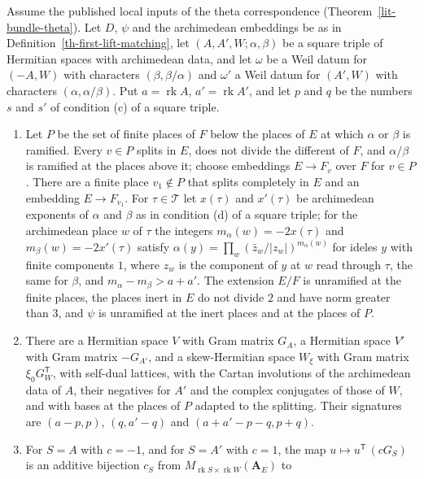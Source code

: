 \begin{lemma}\label{th-darboux-reading}
Assume the published local inputs of the theta correspondence
(Theorem~\ref{lit-bundle-theta}). Let $D$, $\psi$ and the archimedean
embeddings be as in Definition~\ref{th-first-lift-matching}, let
$(A,A',W;\alpha,\beta)$ be a square triple of Hermitian spaces with
archimedean data, and let $\omega$ be a Weil datum for $(-A,W)$ with
characters $(\beta,\beta/\alpha)$ and $\omega'$ a Weil datum for $(A',W)$ with
characters $(\alpha,\alpha/\beta)$. Put $a=\operatorname{rk}A$,
$a'=\operatorname{rk}A'$, and let $p$ and $q$ be the numbers $s$ and $s'$ of
condition (c) of a square triple.
\begin{enumerate}
\item Let $P$ be the set of finite places of $F$ below the places of $E$ at
  which $\alpha$ or $\beta$ is ramified. Every $v\in P$ splits in $E$, does
  not divide the different of $F$, and $\alpha/\beta$ is ramified at the
  places above it; choose embeddings $E\to F_v$ over $F$ for $v\in P$. There
  are a finite place $v_1\notin P$ that splits completely in $E$ and an
  embedding $E\to F_{v_1}$. For $\tau\in\mathcal T$ let $x(\tau)$ and
  $x'(\tau)$ be archimedean exponents of $\alpha$ and $\beta$ as in condition
  (d) of a square triple; for the archimedean place $w$ of $\tau$ the integers
  $m_\alpha(w)=-2x(\tau)$ and $m_\beta(w)=-2x'(\tau)$ satisfy
  $\alpha(y)=\prod_w(\bar z_w/|z_w|)^{m_\alpha(w)}$ for ideles $y$ with
  finite components $1$, where $z_w$ is the component of $y$ at $w$ read
  through $\tau$, the same for $\beta$, and $m_\alpha-m_\beta>a+a'$. The
  extension $E/F$ is unramified at the finite places, the places inert in $E$
  do not divide $2$ and have norm greater than $3$, and $\psi$ is unramified
  at the inert places and at the places of $P$.
\item There are a Hermitian space $V$ with Gram matrix $G_A$, a Hermitian
  space $V'$ with Gram matrix $-G_{A'}$, and a skew-Hermitian space $W_\xi$ with
  Gram matrix $\xi_0G_W^{\mathsf T}$, with self-dual lattices, with the Cartan
  involutions of the archimedean data of $A$, their negatives for $A'$ and the
  complex conjugates of those of $W$, and with bases at the places of $P$
  adapted to the splitting. Their signatures are $(a-p,p)$, $(q,a'-q)$ and
  $(a+a'-p-q,p+q)$.
\item For $S=A$ with $c=-1$, and for $S=A'$ with $c=1$, the map
  $u\mapsto u^{\mathsf T}\,(cG_S)$ is an additive bijection $c_S$ from
  $M_{\operatorname{rk}S\times\operatorname{rk}W}(\mathbf A_E)$ to

\end{enumerate}
\end{lemma}
